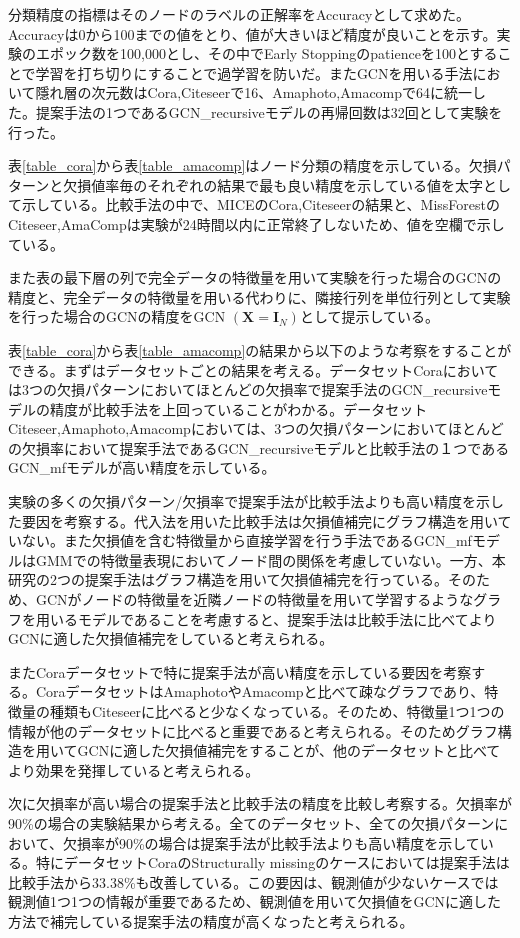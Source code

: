 分類精度の指標はそのノードのラベルの正解率をAccuracyとして求めた。Accuracyは0から100までの値をとり、値が大きいほど精度が良いことを示す。実験のエポック数を100,000とし、その中でEarly Stoppingのpatienceを100とすることで学習を打ち切りにすることで過学習を防いだ。またGCNを用いる手法において隱れ層の次元数はCora,Citeseerで16、Amaphoto,Amacompで64に統一した。提案手法の1つであるGCN\_recursiveモデルの再帰回数は32回として実験を行った。

表\ref{table_cora}から表\ref{table_amacomp}はノード分類の精度を示している。欠損パターンと欠損値率毎のそれぞれの結果で最も良い精度を示している値を太字として示している。比較手法の中で、MICEのCora,Citeseerの結果と、MissForestのCiteseer,AmaCompは実験が24時間以内に正常終了しないため、値を空欄で示している。

また表の最下層の列で完全データの特徴量を用いて実験を行った場合のGCNの精度と、完全データの特徴量を用いる代わりに、隣接行列を単位行列として実験を行った場合のGCNの精度をGCN $(\mathbf{X} = \mathbf{I}_N)$として提示している。

表\ref{table_cora}から表\ref{table_amacomp}の結果から以下のような考察をすることができる。まずはデータセットごとの結果を考える。データセットCoraにおいては3つの欠損パターンにおいてほとんどの欠損率で提案手法のGCN\_recursiveモデルの精度が比較手法を上回っていることがわかる。データセットCiteseer,Amaphoto,Amacompにおいては、3つの欠損パターンにおいてほとんどの欠損率において提案手法であるGCN\_recursiveモデルと比較手法の１つであるGCN\_mfモデルが高い精度を示している。

実験の多くの欠損パターン/欠損率で提案手法が比較手法よりも高い精度を示した要因を考察する。代入法を用いた比較手法は欠損値補完にグラフ構造を用いていない。また欠損値を含む特徴量から直接学習を行う手法であるGCN\_mfモデルはGMMでの特徴量表現においてノード間の関係を考慮していない。一方、本研究の2つの提案手法はグラフ構造を用いて欠損値補完を行っている。そのため、GCNがノードの特徴量を近隣ノードの特徴量を用いて学習するようなグラフを用いるモデルであることを考慮すると、提案手法は比較手法に比べてよりGCNに適した欠損値補完をしていると考えられる。

またCoraデータセットで特に提案手法が高い精度を示している要因を考察する。CoraデータセットはAmaphotoやAmacompと比べて疎なグラフであり、特徴量の種類もCiteseerに比べると少なくなっている。そのため、特徴量1つ1つの情報が他のデータセットに比べると重要であると考えられる。そのためグラフ構造を用いてGCNに適した欠損値補完をすることが、他のデータセットと比べてより効果を発揮していると考えられる。

次に欠損率が高い場合の提案手法と比較手法の精度を比較し考察する。欠損率が90\%の場合の実験結果から考える。全てのデータセット、全ての欠損パターンにおいて、欠損率が90\%の場合は提案手法が比較手法よりも高い精度を示している。特にデータセットCoraのStructurally missingのケースにおいては提案手法は比較手法から33.38\%も改善している。この要因は、観測値が少ないケースでは観測値1つ1つの情報が重要であるため、観測値を用いて欠損値をGCNに適した方法で補完している提案手法の精度が高くなったと考えられる。

